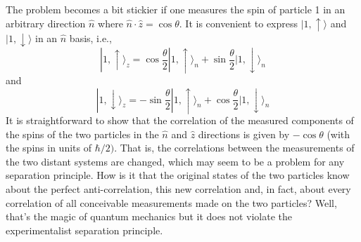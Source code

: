 \documentclass[12pt]{article}
\begin{document}
The problem becomes a bit stickier if one measures the spin of particle 1 in an arbitrary direction $\hat{n}$ where $\hat{n} \cdot \hat{z} = \cos  \theta$. It is convenient to express $|1,\uparrow \rangle$ and $ |1,\downarrow \rangle$ in an $\hat{n}$ basis, i.e., 
\begin{equation}
|1,\uparrow \rangle_z	= \cos{\frac{\theta}{2}} |1,\uparrow \rangle_n + \sin{\frac{\theta}{2}} |1,\downarrow \rangle_n
\end{equation}
and
\begin{equation}
|1,\downarrow \rangle_z	= -\sin{\frac{\theta}{2}} |1,\uparrow \rangle_n + \cos{\frac{\theta}{2}} |1,\downarrow \rangle_n
\end{equation}
It is straightforward to show that the correlation of the measured components of the spins of the two particles in the $\hat{n}$ and $\hat{z}$ directions is given by $-\cos{\theta}$ (with the spins in units of $\hbar / 2)$. That is, the correlations between the measurements of the two distant systems are changed, which may seem to be a problem for any separation principle. How is it that the original states of the two particles know about the perfect anti-correlation, this new correlation and, in fact, about every correlation of all conceivable measurements made on the two particles? Well, that's the magic of quantum mechanics but it does not violate the experimentalist separation principle.
\end{document}

